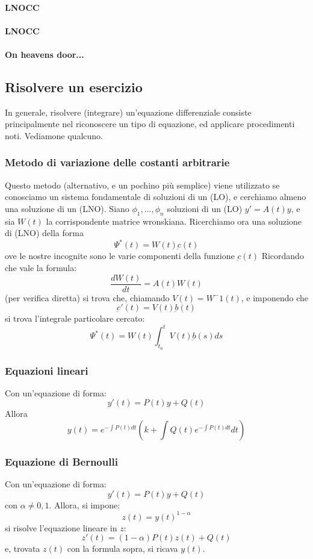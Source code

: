 \documentclass[a4paper,12pt]{article}
\begin{document}
\paragraph{LNOCC}
\paragraph{LNOCC}
\paragraph{On heavens door...}
\subsection{Risolvere un esercizio}
In generale, risolvere (integrare) un'equazione differenziale consiste principalmente nel riconoscere un tipo di equazione, ed applicare procedimenti noti. Vediamone qualcuno.

\subsubsection{Metodo di variazione delle costanti arbitrarie}
Questo metodo (alternativo, e un pochino più semplice) viene utilizzato se conosciamo un sistema fondamentale di soluzioni di un (LO), e cerchiamo almeno una soluzione di un (LNO).
Siano $\phi_1,...,\phi_n$ soluzioni di un (LO) $y'= A(t)y$, e sia $W(t)$ la corrispondente matrice wronskiana.
Ricerchiamo ora una soluzione di (LNO) della forma
$$\Psi^*(t)=W(t)\underbar{c}(t)$$
ove le nostre incognite sono le varie componenti della funzione $\underbar{c}(t)$
Ricordando che vale la formula:
$$\frac{dW(t)}{dt} = A(t)W(t)$$
(per verifica diretta) si trova che, chiamando $V(t) = W^-1(t)$, e imponendo che $$\underbar{c}'(t) = V(t)\underbar{b}(t)$$
si trova l'integrale particolare cercato:
$$\Psi^*(t)= W(t)\int_{t_0}^t V(t)\underbar{b}(s) ds$$

\subsubsection{Equazioni lineari}
Con un'equazione di forma:
$$y'(t) = P(t)y+Q(t)$$
Allora
$$y(t)=e^{- \displaystyle\int P(t)dt}\left(k + \int Q(t)e^{-\displaystyle\int P(t)dt}dt\right)$$
\subsubsection{Equazione di Bernoulli}
Con un'equazione di forma:
$$y'(t) = P(t)y+Q(t)$$
con $\alpha \neq 0, 1$. Allora, si impone:
$$ z(t)=y(t)^{1-\alpha} $$
si risolve l'equazione lineare in $z$: $$z'(t)=(1-\alpha)P(t)z(t)+Q(t)$$ e, trovata $z(t)$ con la formula sopra, si ricava $y(t)$.
\end{document}
